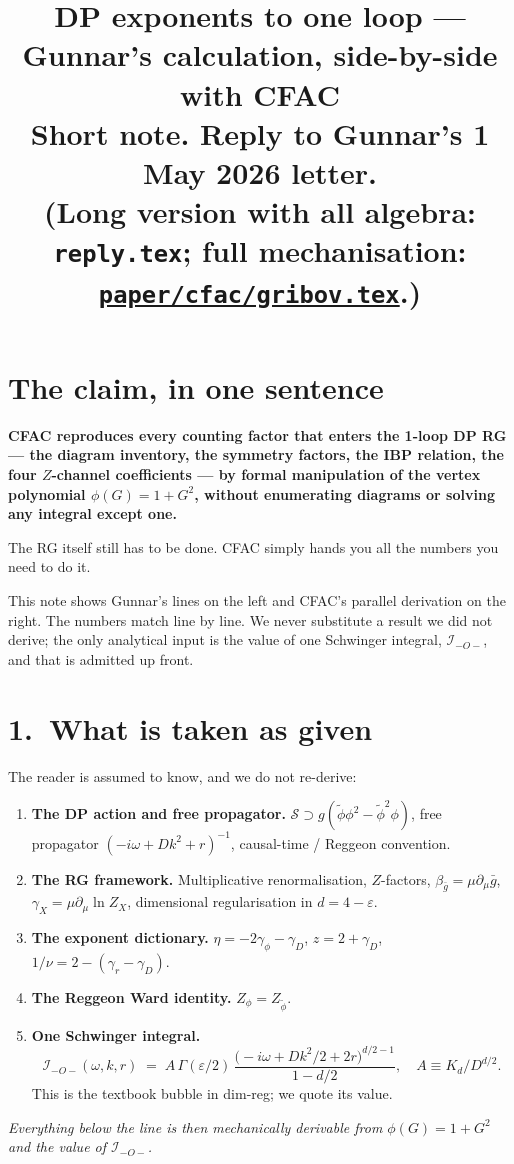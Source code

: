 \documentclass[11pt,a4paper]{article}
\title{\large DP exponents to one loop --- Gunnar's calculation, side-by-side with CFAC\\[2pt]
\normalsize Short note. Reply to Gunnar's 1 May 2026 letter.\\[2pt]
\small (Long version with all algebra: \texttt{reply.tex}; full mechanisation:
\href{../../paper/cfac/gribov.tex}{\texttt{paper/cfac/gribov.tex}}.)}
\author{}
\date{}
\begin{document}
\maketitle
\vspace{-2em}

\section*{The claim, in one sentence}

\begin{tcolorbox}[colback=white,colframe=black!70,boxrule=0.5pt,arc=2pt]
\centering\bfseries
CFAC reproduces every counting factor that enters the 1-loop DP RG --- the
diagram inventory, the symmetry factors, the IBP relation, the four $Z$-channel
coefficients --- by formal manipulation of the vertex polynomial $\phi(G) = 1+G^{2}$,
without enumerating diagrams or solving any integral except one.

\smallskip
The RG itself still has to be done. CFAC simply hands you all the numbers you need to
do it.
\end{tcolorbox}

\noindent
This note shows Gunnar's lines on the left and CFAC's parallel derivation on the right.
The numbers match line by line. We never substitute a result we did not derive; the only
analytical input is the value of one Schwinger integral, $\mathcal I_{-O-}$, and that is
admitted up front.

\section*{1.\ What is taken as given}

\begin{givenbox}
The reader is assumed to know, and we do not re-derive:
\begin{enumerate}[itemsep=2pt,leftmargin=1.5em]
\item \textbf{The DP action and free propagator.} $\mathcal S \supset
g(\widetilde\phi\phi^{2} - \widetilde\phi^{2}\phi)$, free propagator
$(-i\omega + Dk^{2} + r)^{-1}$, causal-time / Reggeon convention.
\item \textbf{The RG framework.} Multiplicative renormalisation, $Z$-factors,
$\beta_{\bar g} = \mu\partial_{\mu}\bar g$, $\gamma_{X} = \mu\partial_{\mu}\ln Z_{X}$,
dimensional regularisation in $d = 4-\varepsilon$.
\item \textbf{The exponent dictionary.} $\eta = -2\gamma_{\phi}-\gamma_{D}$,
$z = 2 + \gamma_{D}$, $1/\nu = 2 - (\gamma_{r}-\gamma_{D})$.
\item \textbf{The Reggeon Ward identity.} $Z_{\phi} = Z_{\widetilde\phi}$.
\item \textbf{One Schwinger integral.}
\[
\mathcal I_{-O-}(\omega,k,r) \;=\; A\,\Gamma(\varepsilon/2)\,
\frac{\bigl(-i\omega + Dk^{2}/2 + 2r\bigr)^{d/2-1}}{1-d/2},
\quad A \equiv K_{d}/D^{d/2}.
\]
This is the textbook bubble in dim-reg; we quote its value.
\end{enumerate}
\textit{Everything below the line is then mechanically derivable from
$\phi(G) = 1+G^{2}$ and the value of $\mathcal I_{-O-}$.}
\end{givenbox}
\end{document}
